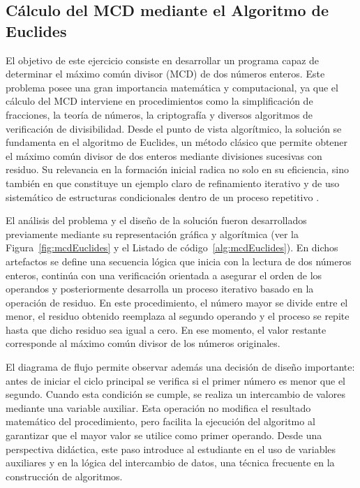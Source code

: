 \documentclass[12pt,twoside]{book}
\begin{document}
				\subsection{Cálculo del MCD mediante el Algoritmo de Euclides}
					\noindent
					El objetivo de este ejercicio consiste en desarrollar un programa capaz de determinar el máximo común divisor (MCD) de dos números enteros. Este problema posee una gran importancia matemática y computacional, ya que el cálculo del MCD interviene en procedimientos como la simplificación de fracciones, la teoría de números, la criptografía y diversos algoritmos de verificación de divisibilidad. Desde el punto de vista algorítmico, la solución se fundamenta en el algoritmo de Euclides, un método clásico que permite obtener el máximo común divisor de dos enteros mediante divisiones sucesivas con residuo. Su relevancia en la formación inicial radica no solo en su eficiencia, sino también en que constituye un ejemplo claro de refinamiento iterativo y de uso sistemático de estructuras condicionales dentro de un proceso repetitivo \cite{Futschek2006Algorithmic,Pressman2019Software,Sommerville2015Software}.
					
					El análisis del problema y el diseño de la solución fueron desarrollados previamente mediante su representación gráfica y algorítmica (ver la Figura~\ref{fig:mcdEuclides} y el Listado de código~\ref{alg:mcdEuclides}). En dichos artefactos se define una secuencia lógica que inicia con la lectura de dos números enteros, continúa con una verificación orientada a asegurar el orden de los operandos y posteriormente desarrolla un proceso iterativo basado en la operación de residuo. En este procedimiento, el número mayor se divide entre el menor, el residuo obtenido reemplaza al segundo operando y el proceso se repite hasta que dicho residuo sea igual a cero. En ese momento, el valor restante corresponde al máximo común divisor de los números originales.
					
					El diagrama de flujo permite observar además una decisión de diseño importante: antes de iniciar el ciclo principal se verifica si el primer número es menor que el segundo. Cuando esta condición se cumple, se realiza un intercambio de valores mediante una variable auxiliar. Esta operación no modifica el resultado matemático del procedimiento, pero facilita la ejecución del algoritmo al garantizar que el mayor valor se utilice como primer operando. Desde una perspectiva didáctica, este paso introduce al estudiante en el uso de variables auxiliares y en la lógica del intercambio de datos, una técnica frecuente en la construcción de algoritmos.
					
\end{document}
